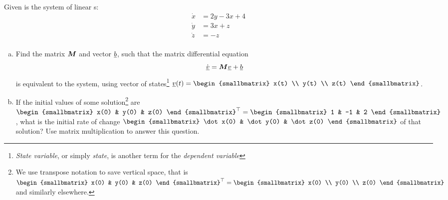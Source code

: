       \begin{question}
      Given is the system of linear \ode{}s:
      \begin{align*}
              \dot x &= 2y - 3x + 4 \\
              \dot y &= 3x + z \\
              \dot z &= -z \\
      \end{align*}

      \begin{enumerate}[(a)]
      \item Find the matrix \(\bm{M}\) and vector \(\underline{b}\), such that the matrix differential equation
      \begin{equation}
      \dot{\underline{v}} = \bm{M} \underline{v} + \underline{b}\label{eq:wk-11-1}
      \end{equation}
        is equivalent to the system, using vector of states\footnote{\emph{State variable}, or simply \emph{state}, is another term for the \emph{dependent variable}} \(\vv{v}(t) =
      \begin{smallbmatrix}
        x(t) \\ y(t) \\ z(t)
      \end{smallbmatrix}
      \).
      \solspace{0.75in}
      \item If the initial values of some solution\footnote{We use transpose notation to save vertical space, that is \(\begin{smallbmatrix}
          x(0) & y(0) & z(0)
        \end{smallbmatrix}^{\top} = \begin{smallbmatrix}
          x(0) \\ y(0) \\ z(0)
        \end{smallbmatrix}\) and similarly elsewhere.} are \(
        \begin{smallbmatrix}
          x(0) & y(0) & z(0)
        \end{smallbmatrix}^{\top} =
        \begin{smallbmatrix}
          1 & -1 & 2
        \end{smallbmatrix}
        \), what is the initial rate of change \(    \begin{smallbmatrix}
          \dot x(0) & \dot y(0) & \dot z(0)
        \end{smallbmatrix}
        \)
        of that solution? Use matrix multiplication to answer this question.
      \solspace{0.25in}


\end{enumerate}
\end{question}
